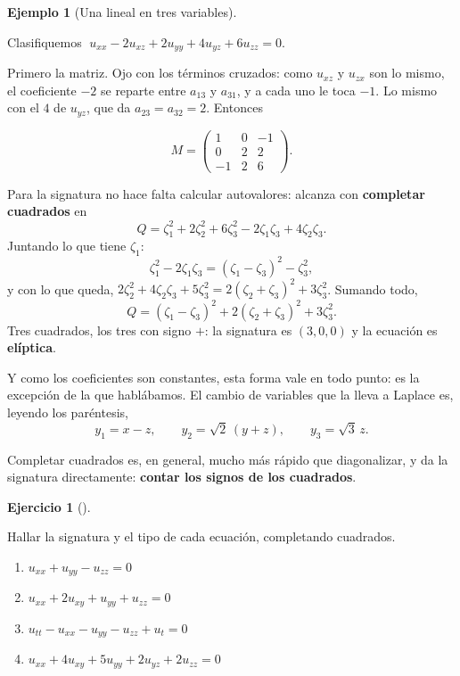 \documentclass[
  spanish,
  a4paper,
]{scrbook}
\providecommand{\tightlist}{%
  \setlength{\itemsep}{0pt}\setlength{\parskip}{0pt}}
\theoremstyle{definition}
\theoremstyle{plain}
\theoremstyle{definition}
\newtheorem{example}{Ejemplo}[chapter]
\theoremstyle{plain}
\theoremstyle{definition}
\newtheorem{exercise}{Ejercicio}[chapter]
\theoremstyle{remark}
\begin{document}
\begin{example}[Una lineal en tres
variables]\protect\hypertarget{exm-tres-variables-clasif}{}\label{exm-tres-variables-clasif}

Clasifiquemos \(\;u_{xx} - 2u_{xz} + 2u_{yy} + 4u_{yz} + 6u_{zz} = 0\).

Primero la matriz. Ojo con los términos cruzados: como \(u_{xz}\) y
\(u_{zx}\) son lo mismo, el coeficiente \(-2\) se reparte entre
\(a_{13}\) y \(a_{31}\), y a cada uno le toca \(-1\). Lo mismo con el
\(4\) de \(u_{yz}\), que da \(a_{23}=a_{32}=2\). Entonces

\[
M = \begin{pmatrix} 1 & 0 & -1 \\ 0 & 2 & 2 \\ -1 & 2 & 6 \end{pmatrix}.
\]

Para la signatura no hace falta calcular autovalores: alcanza con
\textbf{completar cuadrados} en
\[Q = \zeta_1^2 + 2\zeta_2^2 + 6\zeta_3^2 - 2\zeta_1\zeta_3 + 4\zeta_2\zeta_3 .\]
Juntando lo que tiene \(\zeta_1\): \[
\zeta_1^2 - 2\zeta_1\zeta_3 = (\zeta_1-\zeta_3)^2 - \zeta_3^2 ,
\] y con lo que queda,
\(2\zeta_2^2 + 4\zeta_2\zeta_3 + 5\zeta_3^2 = 2(\zeta_2+\zeta_3)^2 + 3\zeta_3^2\).
Sumando todo, \[
Q = (\zeta_1-\zeta_3)^2 + 2(\zeta_2+\zeta_3)^2 + 3\zeta_3^2 .
\] Tres cuadrados, los tres con signo \(+\): la signatura es \((3,0,0)\)
y la ecuación es \textbf{elíptica}.

Y como los coeficientes son constantes, esta forma vale en todo punto:
es la excepción de la que hablábamos. El cambio de variables que la
lleva a Laplace es, leyendo los paréntesis, \[
y_1 = x-z, \qquad y_2 = \sqrt{2}\,(y+z), \qquad y_3 = \sqrt{3}\,z .
\]

Completar cuadrados es, en general, mucho más rápido que diagonalizar, y
da la signatura directamente: \textbf{contar los signos de los
cuadrados}.

\end{example}

\begin{exercise}[]\protect\hypertarget{exr-signaturas}{}\label{exr-signaturas}

Hallar la signatura y el tipo de cada ecuación, completando cuadrados.

\begin{enumerate}
\def\labelenumi{\alph{enumi}.}
\tightlist
\item
  \(u_{xx} + u_{yy} - u_{zz} = 0\)
\item
  \(u_{xx} + 2u_{xy} + u_{yy} + u_{zz} = 0\)
\item
  \(u_{tt} - u_{xx} - u_{yy} - u_{zz} + u_t = 0\)
\item
  \(u_{xx} + 4u_{xy} + 5u_{yy} + 2u_{yz} + 2u_{zz} = 0\)
\end{enumerate}

\end{exercise}
\end{document}
